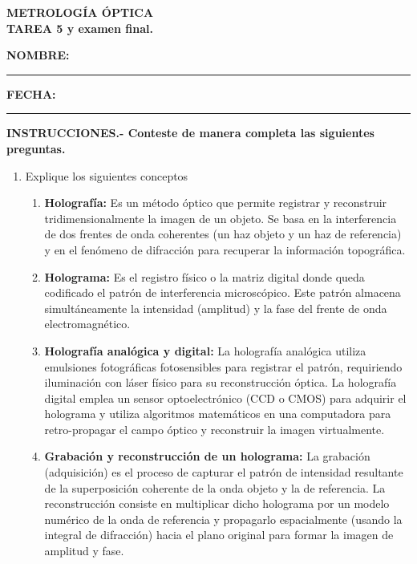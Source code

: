 \documentclass[12pt,a4paper]{article}
\begin{document}
	
	\begin{center}
		\textbf{METROLOGÍA ÓPTICA} \\
		\textbf{TAREA 5 y examen final.}
	\end{center}
	
	\vspace{0.5cm}
	\noindent
	\textbf{NOMBRE:}\rule{8cm}{0.4pt} \hfill \textbf{FECHA:}\rule{3cm}{0.4pt}
	
	\vspace{0.8cm}
	\noindent \textbf{INSTRUCCIONES.- Conteste de manera completa las siguientes preguntas.}
	
	\begin{enumerate}
		\item Explique los siguientes conceptos
		\begin{enumerate}
			\item \textbf{Holografía:} Es un método óptico que permite registrar y reconstruir tridimensionalmente la imagen de un objeto. Se basa en la interferencia de dos frentes de onda coherentes (un haz objeto y un haz de referencia) y en el fenómeno de difracción para recuperar la información topográfica.
			\item \textbf{Holograma:} Es el registro físico o la matriz digital donde queda codificado el patrón de interferencia microscópico. Este patrón almacena simultáneamente la intensidad (amplitud) y la fase del frente de onda electromagnético.
			\item \textbf{Holografía analógica y digital:} La holografía analógica utiliza emulsiones fotográficas fotosensibles para registrar el patrón, requiriendo iluminación con láser físico para su reconstrucción óptica. La holografía digital emplea un sensor optoelectrónico (CCD o CMOS) para adquirir el holograma y utiliza algoritmos matemáticos en una computadora para retro-propagar el campo óptico y reconstruir la imagen virtualmente.
			\item \textbf{Grabación y reconstrucción de un holograma:} La grabación (adquisición) es el proceso de capturar el patrón de intensidad resultante de la superposición coherente de la onda objeto y la de referencia. La reconstrucción consiste en multiplicar dicho holograma por un modelo numérico de la onda de referencia y propagarlo espacialmente (usando la integral de difracción) hacia el plano original para formar la imagen de amplitud y fase.
		\end{enumerate}
		

\end{enumerate}
\end{document}
